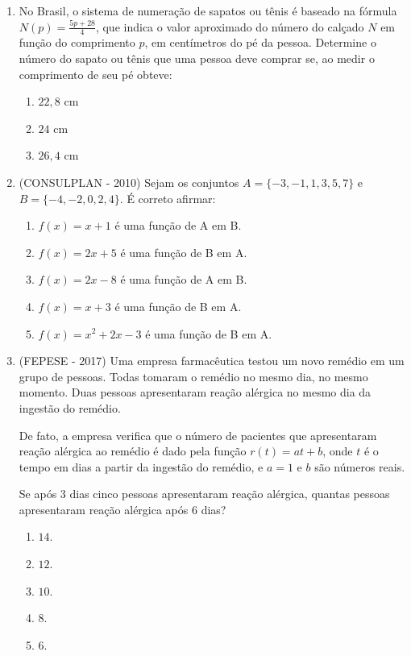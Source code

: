 \begin{enumerate}
  \item No Brasil, o sistema de numeração de sapatos ou tênis é baseado na fórmula $N(p)= \frac{5p + 28}{4}$, que indica o valor aproximado do
  número do calçado $N$ em função do comprimento $p$, em centímetros do pé da pessoa. Determine o número do sapato ou tênis que uma pessoa deve 
  comprar se, ao medir o comprimento de seu pé obteve:
  \begin{enumerate}
  \item $22,8$ cm
  \item $24$ cm
  \item $26,4$ cm 
  \end{enumerate}
  
  \item (CONSULPLAN - 2010) Sejam os conjuntos $A = \{- 3, - 1, 1, 3, 5, 7\}$ e $B = \{- 4, -2, 0, 2, 4\}$. É correto afirmar:
  \begin{enumerate}
  \item $f(x) = x + 1$ é uma função de A em B.
  \item $f(x) = 2x + 5$ é uma função de B em A.
  \item $f(x) = 2x - 8$ é uma função de A em B.
  \item $f(x) = x + 3$ é uma função de B em A.
  \item $f(x) = x^2 + 2x - 3$ é uma função de B em A.
 \end{enumerate}
 
 \item (FEPESE - 2017) Uma empresa farmacêutica testou um novo remédio em um grupo de pessoas. Todas tomaram o remédio no mesmo dia, no mesmo momento. Duas pessoas apresentaram reação alérgica no mesmo dia da ingestão do remédio. 

 De fato, a empresa verifica que o número de pacientes que apresentaram reação alérgica ao remédio é dado pela função $r(t) = a t + b$, onde $t$ é o tempo em dias a partir da ingestão do remédio, e $a= 1$ e $b$ são números reais.

 Se após $3$ dias cinco pessoas apresentaram reação alérgica, quantas pessoas apresentaram reação alérgica após $6$ dias?
 \begin{enumerate}
  \item $14$.
  \item $12$.
  \item $10$.
  \item $8$.
  \item $6$.
 \end{enumerate}
 

\end{enumerate}
